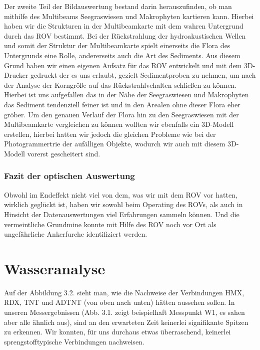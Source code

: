 Der zweite Teil der Bildauswertung bestand darin herauszufinden, ob man mithilfe des Multibeams Seegraswiesen und Makrophyten kartieren kann. Hierbei haben wir die Strukturen in der Multibeamkarte mit dem wahren Untergrund durch das ROV bestimmt.
Bei der Rückstrahlung der hydroakustischen Wellen und somit der Struktur der Multibeamkarte spielt einerseits die Flora des Untergrunds eine Rolle, andererseits auch die Art des Sediments.
Aus diesem Grund haben wir einen eigenen Aufsatz für das ROV entwickelt und mit dem 3D-Drucker gedruckt der es uns erlaubt, gezielt Sedimentproben zu nehmen, um nach der Analyse der Korngröße auf das Rückstrahlvehalten schließen zu können.
Hierbei ist uns aufgefallen das in der Nähe der Seegraswiesen und Makrophyten das Sediment tendenziell feiner ist und in den Arealen ohne dieser Flora eher gröber.
Um den genauen Verlauf der Flora hin zu den Seegraswiesen mit der Multibeamkarte vergleichen zu können wollten wir ebenfalls ein 3D-Modell erstellen, hierbei hatten wir jedoch die gleichen Probleme wie bei der Photogrammertrie der aufälligen Objekte, wodurch wir auch mit diesem 3D-Modell vorerst gescheitert sind.

\subsubsection{Fazit der optischen Auswertung}
Obwohl im Endeffekt nicht viel von dem, was wir mit dem ROV vor hatten, wirklich geglückt ist, haben wir sowohl beim Operating des ROVs, als auch in Hinsicht der Datenauswertungen viel Erfahrungen sammeln können. Und die vermeintliche Grundmine konnte mit Hilfe des ROV noch vor Ort als ungefährliche Ankerfurche identifiziert werden.

\section{Wasseranalyse}
Auf der Abbildung 3.2. sieht man, wie die Nachweise der Verbindungen HMX, RDX, TNT und ADTNT (von oben nach unten) hätten aussehen sollen. In unseren Messergebnissen (Abb. 3.1. zeigt beispielhaft Messpunkt W1, es sahen aber alle ähnlich aus), sind an den erwarteten Zeit keinerlei signifikante Spitzen zu erkennen. Wir konnten, für uns durchaus etwas überraschend, keinerlei sprengstofftypische Verbindungen nachweisen.


